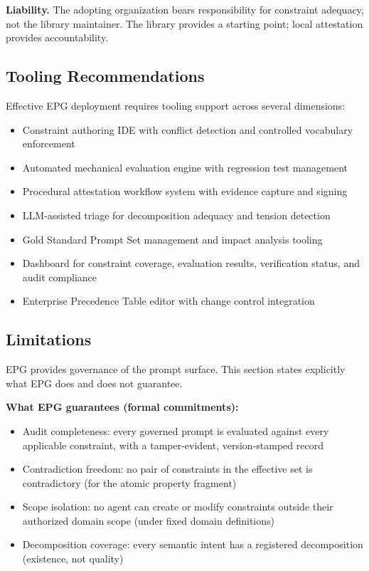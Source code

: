 \textbf{Liability.} The adopting organization bears responsibility for constraint adequacy, not the library maintainer. The library provides a starting point; local attestation provides accountability.

\subsection{Tooling Recommendations}


Effective EPG deployment requires tooling support across several dimensions:

\begin{itemize}
  \item Constraint authoring IDE with conflict detection and controlled vocabulary enforcement
  \item Automated mechanical evaluation engine with regression test management
  \item Procedural attestation workflow system with evidence capture and signing
  \item LLM-assisted triage for decomposition adequacy and tension detection
  \item Gold Standard Prompt Set management and impact analysis tooling
  \item Dashboard for constraint coverage, evaluation results, verification status, and audit compliance
  \item Enterprise Precedence Table editor with change control integration
\end{itemize}


\subsection{Limitations}


EPG provides governance of the prompt surface. This section states explicitly what EPG does and does not guarantee.

\textbf{What EPG guarantees (formal commitments):}

\begin{itemize}
  \item Audit completeness: every governed prompt is evaluated against every applicable constraint, with a tamper-evident, version-stamped record
  \item Contradiction freedom: no pair of constraints in the effective set is contradictory (for the atomic property fragment)
  \item Scope isolation: no agent can create or modify constraints outside their authorized domain scope (under fixed domain definitions)
  \item Decomposition coverage: every semantic intent has a registered decomposition (existence, not quality)
\end{itemize}


